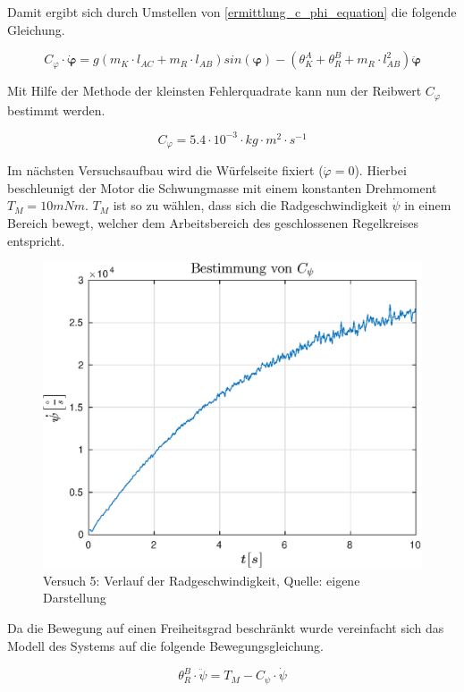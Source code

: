 Damit ergibt sich durch Umstellen von \ref{ermittlung_c_phi_equation} die folgende Gleichung.

\begin{equation}
C_{\varphi} \cdot \boldsymbol{\dot{\varphi}} = g(m_K \cdot l_{AC} + m_R \cdot l_{AB})sin(\boldsymbol{\varphi}) - (\theta^A_K + \theta^B_R + m_R  \cdot l_{AB}^2) \boldsymbol{\ddot{\varphi}}
\end{equation}

Mit Hilfe der Methode der kleinsten Fehlerquadrate kann nun der Reibwert $C_{\varphi}$ bestimmt werden.

\begin{equation}
C_{\varphi} = 5.4 \cdot 10^{-3} \cdot kg \cdot m^2 \cdot s^{-1}
\end{equation}


Im nächsten Versuchsaufbau wird die Würfelseite fixiert ($\dot{\varphi} = 0$). Hierbei beschleunigt der Motor die Schwungmasse mit einem konstanten Drehmoment $T_M=10mNm$. $T_M$ ist so zu wählen, dass sich die Radgeschwindigkeit $\dot{\psi}$ in einem Bereich bewegt, welcher dem Arbeitsbereich des geschlossenen Regelkreises entspricht. 

\begin{figure}[h!]
\centering
\includegraphics[width=0.6\linewidth]{img/C_psi.eps}
\caption{Versuch 5: Verlauf der Radgeschwindigkeit, Quelle: eigene Darstellung}
\end{figure}


Da die Bewegung auf einen Freiheitsgrad beschränkt wurde vereinfacht sich das Modell des Systems auf die folgende Bewegungsgleichung.

\begin{equation}
\label{ermittlung_c_psi_equation}
\theta^B_R \cdot \ddot{\psi} = T_M - C_\psi \cdot \dot{\psi}
\end{equation}

